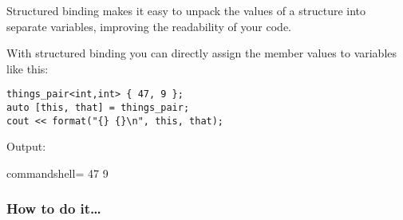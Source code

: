 
Structured binding makes it easy to unpack the values of a structure into separate variables, improving the readability of your code.

With structured binding you can directly assign the member values to variables like this:

\begin{lstlisting}[style=styleCXX]
things_pair<int,int> { 47, 9 };
auto [this, that] = things_pair;
cout << format("{} {}\n", this, that);
\end{lstlisting}

Output:

\begin{tcblisting}{commandshell={}}
47 9
\end{tcblisting}

\subsubsection{How to do it…}

